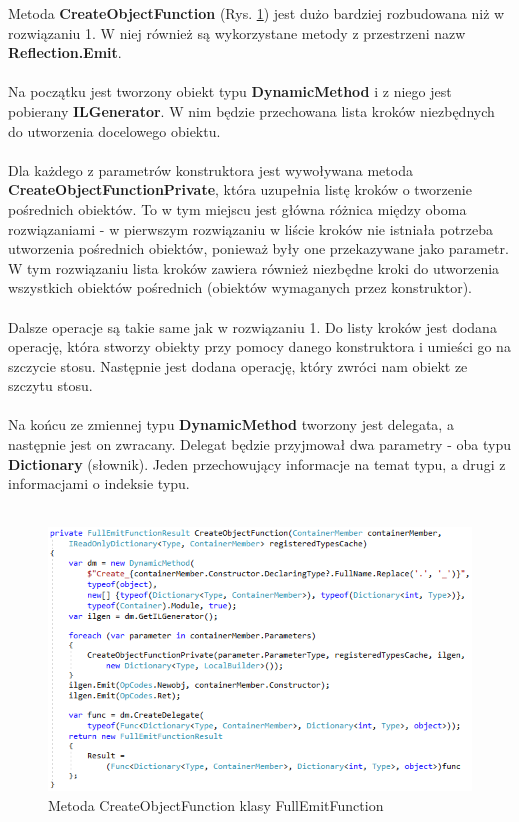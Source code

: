 \documentclass[12pt]{article}
\begin{document}
Metoda \textbf{CreateObjectFunction} (Rys. \ref{fig:FullEmitFunction_CreateObjectFunction}) jest dużo bardziej rozbudowana niż w rozwiązaniu 1. W niej również są wykorzystane metody z przestrzeni nazw \textbf{Reflection.Emit}.\\
\\
Na początku jest tworzony obiekt typu \textbf{DynamicMethod} i z niego jest pobierany \textbf{ILGenerator}. W nim będzie przechowana lista kroków niezbędnych do utworzenia docelowego obiektu.\\
\\
Dla każdego z parametrów konstruktora jest wywoływana metoda \textbf{CreateObjectFunctionPrivate}, która uzupełnia listę kroków o tworzenie pośrednich obiektów. To w tym miejscu jest główna różnica między oboma rozwiązaniami - w pierwszym rozwiązaniu w liście kroków nie istniała potrzeba utworzenia pośrednich obiektów, ponieważ były one przekazywane jako parametr. W tym rozwiązaniu lista kroków zawiera również niezbędne kroki do utworzenia wszystkich obiektów pośrednich (obiektów wymaganych przez konstruktor).\\
\\
Dalsze operacje są takie same jak w rozwiązaniu 1. Do listy kroków jest dodana operację, która stworzy obiekty przy pomocy danego konstruktora i umieści go na szczycie stosu. Następnie jest dodana operację, który zwróci nam obiekt ze szczytu stosu.\\
\\
Na końcu ze zmiennej typu \textbf{DynamicMethod} tworzony jest delegata, a następnie jest on zwracany. Delegat będzie przyjmował dwa parametry - oba typu \textbf{Dictionary} (słownik). Jeden przechowujący informacje na temat typu, a drugi z informacjami o indeksie typu.\\ \\
\begin{figure}[H]
	\begin{center}
  		\includegraphics{FullEmitFunction_CreateObjectFunction.png}
  		\caption{Metoda CreateObjectFunction klasy FullEmitFunction}
  		\label{fig:FullEmitFunction_CreateObjectFunction}
	\end{center}
\end{figure}
\end{document}
